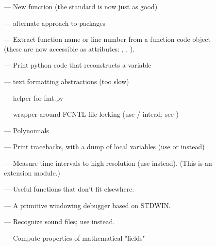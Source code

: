 
\begin{description}
\item[]
--- New  function (the standard  is
now just as good)

\item[]
--- alternate approach to packages

\item[]
--- Extract function name or line number from a function
code object (these are now accessible as attributes:
, ,
).

\item[]
--- Print python code that reconstructs a variable

\item[]
--- text formatting abstractions (too slow)

\item[]
--- helper for fmt.py

\item[]
--- wrapper around FCNTL file locking (use
/ intead; see )

\item[]
--- Polynomials

\item[]
--- Print tracebacks, with a dump of local variables (use
 or  instead)

\item[]
--- Measure time intervals to high resolution (use
 instead).  (This is an extension module.)

\item[]
--- Useful functions that don't fit elsewhere.

\item[]
--- A primitive windowing debugger based on STDWIN.

\item[]
--- Recognize sound files; use  instead.

\item[]
--- Compute properties of mathematical "fields"
\end{description}


